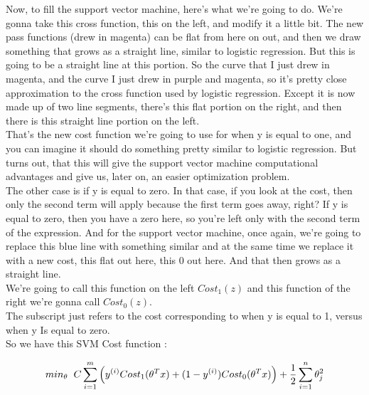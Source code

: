 \pagebreak

Now, to fill the support vector machine, here's what we're going to do. We're gonna take this cross function, this on the left, and modify it a little bit. The new pass functions (drew in magenta) can be flat from here on out, and then we draw something that grows as a straight line, similar to logistic regression. But this is going to be a straight line at this portion. So the curve that I just drew in magenta, and the curve I just drew in purple and magenta, so it's pretty close approximation to the cross function used by logistic regression. Except it is now made up of two line segments, there's this flat portion on the right, and then there is this straight line portion on the left. \\

That's the new cost function we're going to use for when y is equal to one, and you can imagine it should do something pretty similar to logistic regression. But turns out, that this will give the support vector machine computational advantages and give us, later on, an easier optimization problem.\\

The other case is if y is equal to zero. In that case, if you look at the cost, then only the second term will apply because the first term goes away, right? If y is equal to zero, then you have a zero here, so you're left only with the second term of the expression. And for the support vector machine, once again, we're going to replace this blue line with something similar and at the same time we replace it with a new cost, this flat out here, this 0 out here. And that then grows as a straight line.\\

We're going to call this function on the left $ Cost_1(z) $ and this function of the right we're gonna call $ Cost_0(z) $. \\

The subscript just refers to the cost corresponding to when y is equal to 1, versus when y Is equal to zero.\\

So we have this SVM Cost function :

\begin{equation}
min_\theta  \hspace{0.2cm} C \sum_{i=1}^{m}\left( y^{(i)} Cost_1(\theta^T x) +(1- y^{(i)}) Cost_0(\theta^T x) \right) + \frac{1}{2}  \sum_{i=1}^{n} \theta_j^2
\end{equation}

